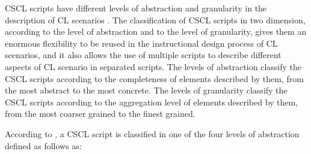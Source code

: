 CSCL scripts have different levels of abstraction and granularity in the description of CL scenarios \cite{Dillenbourg2002, DillenbourgJermann2007, Villasclaras-FernandezIsotaniHayashiMizoguchi2009}.
The classification of CSCL scripts in two dimension, according to the level of abstraction and to the level of granularity, gives them an enormous flexibility to be reused in the instructional design process of CL scenarios, and it also allows the use of multiple scripts to describe different aspects of CL scenario in separated scripts.
The levels of abstraction classify the CSCL scripts according to the completeness of elements described by them, from the most abstract to the most concrete.
The levels of granularity classify the CSCL scripts according to the aggregation level of elements described by them, from the most coarser grained to the finest grained.

According to , a CSCL script is classified in one of the four levels of abstraction defined as follows as:

